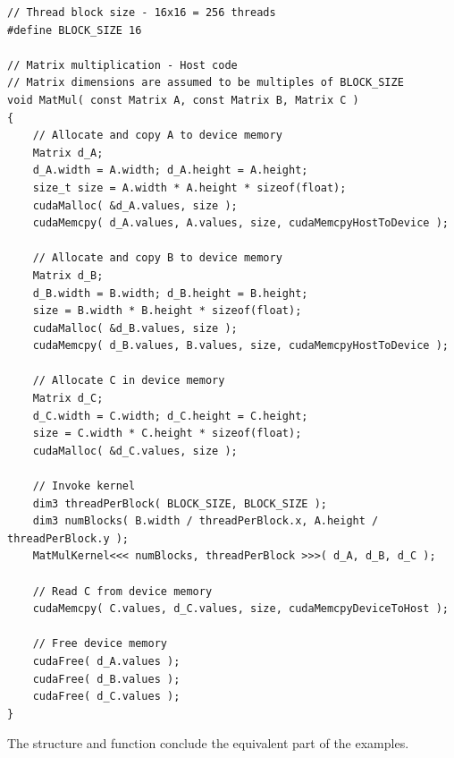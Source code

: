 \begin{lstlisting}[caption={Definition of the function that will allocate and copy all matrices to the device, invoke the kernel and then free the device memory. The size of the thread block is constant and set during compile time using the \code{\#define} macro. Taken from Nvidia's \emph{CUDA C++ Programming Guide} \cite{NVIDIAMay2022}.},label={Listing:theory-CUDA-matrix-multiplication-host-mat-mul-function}]
// Thread block size - 16x16 = 256 threads
#define BLOCK_SIZE 16

// Matrix multiplication - Host code
// Matrix dimensions are assumed to be multiples of BLOCK_SIZE
void MatMul( const Matrix A, const Matrix B, Matrix C )
{
	// Allocate and copy A to device memory
	Matrix d_A;
	d_A.width = A.width; d_A.height = A.height;
	size_t size = A.width * A.height * sizeof(float);
	cudaMalloc( &d_A.values, size );
	cudaMemcpy( d_A.values, A.values, size, cudaMemcpyHostToDevice );
	
	// Allocate and copy B to device memory
	Matrix d_B;
	d_B.width = B.width; d_B.height = B.height;
	size = B.width * B.height * sizeof(float);
	cudaMalloc( &d_B.values, size );
	cudaMemcpy( d_B.values, B.values, size, cudaMemcpyHostToDevice );
	
	// Allocate C in device memory
	Matrix d_C;
	d_C.width = C.width; d_C.height = C.height;
	size = C.width * C.height * sizeof(float);
	cudaMalloc( &d_C.values, size );
	
	// Invoke kernel
	dim3 threadPerBlock( BLOCK_SIZE, BLOCK_SIZE );
	dim3 numBlocks( B.width / threadPerBlock.x, A.height / threadPerBlock.y );
	MatMulKernel<<< numBlocks, threadPerBlock >>>( d_A, d_B, d_C );
	
	// Read C from device memory
	cudaMemcpy( C.values, d_C.values, size, cudaMemcpyDeviceToHost );
	
	// Free device memory
	cudaFree( d_A.values );
	cudaFree( d_B.values );
	cudaFree( d_C.values );
}
\end{lstlisting}

The  structure and  function conclude the equivalent part of the examples.

